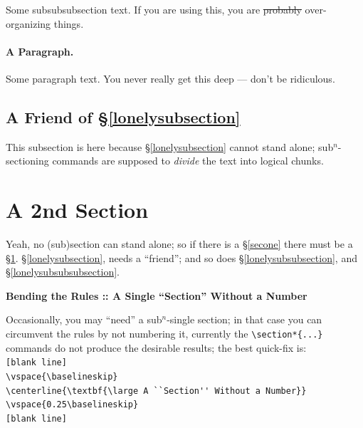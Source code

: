 \label{lonelysubsubsubsection}

Some subsubsubsection text.  If you are using this, you are
\sout{probably} over-organizing things.

\paragraph{A Paragraph.}

Some paragraph text.  You never really get this deep --- don't be
ridiculous.

\subsection{A Friend of \S\ref{lonelysubsection}}

This subsection is here because \S\ref{lonelysubsection} cannot stand
alone; sub$^{n}$-sectioning commands are supposed to \emph{divide} the
text into logical chunks.

\section{A 2nd Section}
\label{sectwo}

Yeah, no (sub)section can stand alone; so if there is a \S\ref{secone}
there must be a \S\ref{sectwo}. \S\ref{lonelysubsection}, needs a
``friend''; and so does \S\ref{lonelysubsubsection}, and
\S\ref{lonelysubsubsubsection}.

\vspace{\baselineskip}
\centerline{\textbf{\large Bending the Rules :: A Single ``Section'' Without a Number}}
\vspace{0.25\baselineskip}

Occasionally, you may ``need'' a  sub$^n$-single section; in that case
you can circumvent the rules by not numbering it, currently the
\verb+\section*{...}+ commands do not produce the desirable results;
the best quick-fix is:\\[0.25\baselineskip]
\hspace*{2em}\verb+[blank line]+\\
\hspace*{2em}\verb+\vspace{\baselineskip}+\\
\hspace*{2em}\verb+\centerline{\textbf{\large A ``Section'' Without a Number}}+\\
\hspace*{2em}\verb+\vspace{0.25\baselineskip}+\\
\hspace*{2em}\verb+[blank line]+\\






